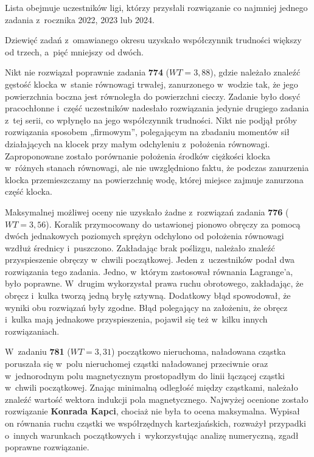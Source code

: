 {{{Lista obejmuje uczestników ligi, którzy przysłali rozwiązanie co najmniej jednego zadania z~rocznika 2022, 2023 lub 2024.     
}}

	
Dziewięć zadań z~omawianego okresu uzyskało współczynnik trudności większy od trzech, a~pięć mniejszy od dwóch.

Nikt nie rozwiązał poprawnie zadania {\bf 774} ($WT = 3{,}88$), gdzie należało znaleźć gęstość klocka w~stanie równowagi trwałej, zanurzonego w~wodzie tak, że jego powierzchnia boczna jest równoległa do powierzchni cieczy. Zadanie było dosyć pracochłonne i~część uczestników nadesłało rozwiązania jedynie drugiego zadania z~tej serii, co wpłynęło na jego współczynnik trudności. Nikt nie podjął próby rozwiązania sposobem „firmowym”, polegającym na zbadaniu momentów sił działających na klocek przy małym odchyleniu z~położenia równowagi. Zaproponowane zostało porównanie położenia środków ciężkości klocka w~różnych stanach równowagi, ale nie uwzględniono faktu, że podczas zanurzenia klocka przemieszczamy na powierzchnię wodę, której miejsce zajmuje zanurzona część klocka.

Maksymalnej możliwej oceny nie uzyskało żadne z~rozwiązań zadania {\bf 776} (${WT = 3{,}56}$). Koralik przymocowany do ustawionej pionowo obręczy za pomocą dwóch jednakowych poziomych sprężyn odchylono od położenia równowagi wzdłuż średnicy i~puszczono. Zakładając brak poślizgu, należało znaleźć przyspieszenie obręczy w~chwili początkowej. Jeden z~uczestników podał dwa rozwiązania tego zadania. Jedno, w~którym zastosował równania Lagrange’a, było poprawne. W~drugim wykorzystał prawa ruchu obrotowego, zakładając, że obręcz i~kulka tworzą jedną bryłę sztywną. Dodatkowy błąd spowodował, że wyniki obu rozwiązań były zgodne. Błąd polegający na założeniu, że obręcz i~kulka mają jednakowe przyspieszenia, pojawił się też w~kilku innych rozwiązaniach.

W~zadaniu {\bf781} ($WT = 3{,}31$) początkowo nieruchoma, naładowana cząstka poruszała się w~polu nieruchomej cząstki naładowanej przeciwnie oraz w~jednorodnym polu magnetycznym prostopadłym do linii łączącej cząstki w~chwili początkowej. Znając minimalną odległość między cząstkami, należało znaleźć wartość  wektora indukcji pola magnetycznego. Najwyżej ocenione zostało rozwiązanie {\bf Konrada Kapci}, chociaż nie była to ocena maksymalna. Wypisał on równania ruchu cząstki we współrzędnych kartezjańskich, rozważył przypadki o~innych warunkach początkowych i~wykorzystując analizę numeryczną, zgadł poprawne rozwiązanie.

}
